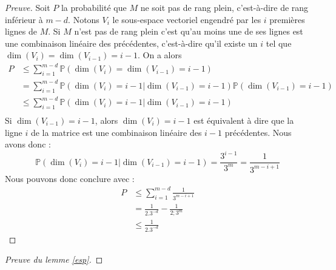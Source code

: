 \documentclass[12pt]{article}
\theoremstyle{plain}
\theoremstyle{definition}
\begin{document}
\begin{appendix}
\begin{proof}[Preuve]
Soit $P$ la probabilité que $M$ ne soit pas de rang plein, c'est-à-dire de rang inférieur à $m-d$.
Notons $V_i$ le sous-espace vectoriel engendré par les $i$ premières lignes de $M$. Si $M$ n'est pas de rang plein c'est qu'au moins une de ses lignes est une combinaison linéaire des précédentes, c'est-à-dire qu'il existe un $i$ tel que $\dim(V_i) = \dim(V_{i-1}) = i-1$. On a alors
\begin{equation*}
\begin{split}
P &\leq \sum\limits_{i=1}^{m-d} \mathbb{P}(\dim(V_i) = \dim(V_{i-1}) = i-1) \\
&= \sum\limits_{i=1}^{m-d} \mathbb{P}(\dim(V_i) =i-1 | \dim(V_{i-1}) = i-1)\mathbb{P}(\dim(V_{i-1}) = i-1) \\
&\leq \sum\limits_{i=1}^{m-d} \mathbb{P}(\dim(V_i) =i-1 | \dim(V_{i-1}) = i-1) \\
\end{split}
\end{equation*}
Si $\dim(V_{i-1}) = i-1$, alors $\dim(V_i) = i-1$ est équivalent à dire que la ligne $i$ de la matrice est une combinaison linéaire des $i-1$ précédentes. Nous avons donc :
$$ \mathbb{P}(\dim(V_i) =i-1 | \dim(V_{i-1}) = i-1) = \frac{3^{i-1}}{3^m} = \frac{1}{3^{m-i+1}} $$
Nous pouvons donc conclure avec :
\begin{equation*}
\begin{split}
P &\leq \sum\limits_{i=1}^{m-d} \frac{1}{3^{m-i+1}}\\
& = \frac{1}{2.3^{-d}} - \frac{1}{2;3^m}\\
&\leq  \frac{1}{2.3^{-d}} 
\end{split}
\end{equation*}
\end{proof}

\begin{proof}[Preuve du lemme \ref{esp}]


\end{proof}
\end{appendix}
\end{document}
